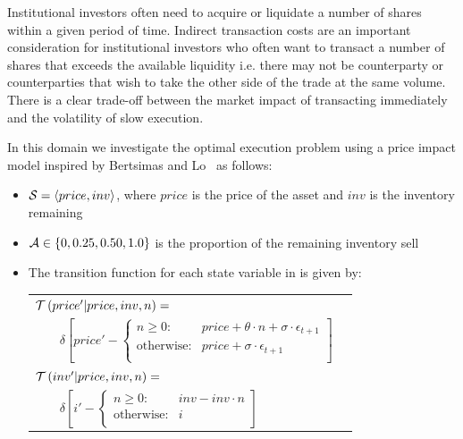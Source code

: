 Institutional investors often need to acquire or liquidate a number of shares within a given period of time. Indirect transaction costs are an important consideration for institutional investors who often want to transact a number of shares that exceeds the available liquidity i.e. there may not be counterparty or counterparties that wish to take the other side of the trade at the same volume. There is a clear trade-off between the market impact of transacting immediately and the volatility of slow execution. 

In this domain we investigate the optimal execution problem using a price impact model inspired by Bertsimas and Lo~\parencite{Bertsimas_JFM_1998} as follows:
\begin{itemize}
    \item {\footnotesize $ \mathcal{S} = \left\langle price, inv \right\rangle$}, where $ price $ is the price of the asset and $ inv $ is the inventory remaining 
    \item {\footnotesize $ \mathcal{A} \in \left\lbrace 0, 0.25, 0.50, 1.0 \right\rbrace $} is the proportion of the remaining inventory sell
    \item The transition function {\footnotesize \Transition} for each state variable in {\footnotesize \State} is given by:    \\
    {\footnotesize 
        \abovedisplayskip=5pt
        \belowdisplayskip=0pt
        \renewcommand{\arraystretch}{1.5}
        \begin{tabular}{ll}
            $ \mathcal{T}\left( price' | price, inv, n \right) = $ & $ $ \\
                $ \qquad \delta \left[ price' - \begin{cases}
                n \geq 0  : & price + \theta \cdot n + \sigma \cdot \epsilon_{t+1} \\
                \text{otherwise} : & price + \sigma \cdot \epsilon_{t+1} \\
                \end{cases} \right] $ & $ $\\            
            $ \mathcal{T}\left( inv' | price, inv, n \right) = $ & $ $ \\
                $ \qquad \delta \left[ i' - \begin{cases}
                n \geq 0 : & inv - inv \cdot n \\
                \text{otherwise} : & i \\
                \end{cases} \right] $ & $ $\\

\end{tabular}}
\end{itemize}
